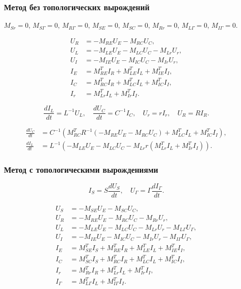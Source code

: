 	\subsubsection{Метод без топологических вырождений}
	
	$M_{Sr} = 0$, $M_{S\Gamma} = 0$, $M_{R\Gamma} = 0$, $M_{SE} = 0$, $M_{SC} = 0$, $M_{Rr} = 0$, $M_{L\Gamma} = 0$, $M_{I\Gamma} = 0$.
	
	\begin{align}
		U_R &= -M_{RE} U_E - M_{RC} U_C, \\
		U_L &= -M_{LE} U_E - M_{LC} U_C - M_{Lr} U_r, \\
		U_I &= -M_{IE} U_E - M_{IC} U_C - M_{Ir} U_r, \\
		I_E &= M_{RE}^T I_R + M_{LE}^T I_L + M_{IE}^T I_I, \\
		I_C &= M_{RC}^T I_R + M_{LC}^T I_L + M_{IC}^T I_I, \\
		I_r &= M_{Lr}^T I_L + M_{Ir}^T I_I.
	\end{align}
	
	\begin{equation}
		\frac{d I_L}{dt} = L^{-1} U_L, \quad \frac{d U_C}{dt} = C^{-1} I_C, \quad U_r = r I_r, \quad U_R = R I_R.
	\end{equation}
	
	\begin{align}
		\frac{d U_C}{dt} &= C^{-1} \left( M_{RC}^T R^{-1} (-M_{RE} U_E - M_{RC} U_C) + M_{LC}^T I_L + M_{IC}^T I_I \right), \\
		\frac{d I_L}{dt} &= L^{-1} (-M_{LE} U_E - M_{LC} U_C - M_{Lr} r (M_{Lr}^T I_L + M_{Ir}^T I_I)).
	\end{align}
	
	\subsubsection{Метод с топологическими вырождениями}
	
	\begin{equation}
		I_S = S \frac{d U_S}{dt}, \quad U_\Gamma = \Gamma \frac{d I_\Gamma}{dt}.
	\end{equation}
	
	\begin{align}
		U_S &= -M_{SE} U_E - M_{SC} U_C, \\
		U_R &= -M_{RE} U_E - M_{RC} U_C - M_{Rr} U_r, \\
		U_L &= -M_{LE} U_E - M_{LC} U_C - M_{Lr} U_r - M_{L\Gamma} U_\Gamma, \\
		U_I &= -M_{IE} U_E - M_{IC} U_C - M_{Ir} U_r - M_{I\Gamma} U_\Gamma, \\
		I_E &= M_{SE}^T I_S + M_{RE}^T I_R + M_{LE}^T I_L + M_{IE}^T I_I, \\
		I_C &= M_{SC}^T I_S + M_{RC}^T I_R + M_{LC}^T I_L + M_{IC}^T I_I, \\
		I_r &= M_{Rr}^T I_R + M_{Lr}^T I_L + M_{Ir}^T I_I, \\
		I_\Gamma &= M_{L\Gamma}^T I_L + M_{I\Gamma}^T I_I.
	\end{align}
	
